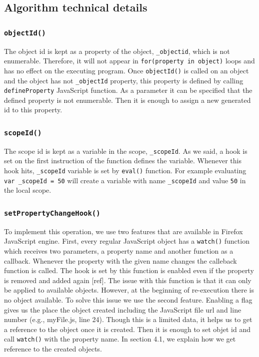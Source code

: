 \documentclass[preprint]{sigplanconf}
\begin{document}
\subsection{Algorithm technical details}
\subsubsection{\texttt{objectId()}}
The object id is kept as a property of the object, \texttt{\_objectid}, which is not enumerable. Therefore, it will not appear in \texttt{for(property in object)} loops and has no effect on the executing program. Once \texttt{objectId()} is called on an object and the object has not \texttt{\_objectId} property, this property is defined by calling \texttt{defineProperty} JavaScript function. As a parameter it can be specified that the defined property is not enumerable. Then it is enough to assign a new generated id to this property.

\subsubsection{\texttt{scopeId()}}
The scope id is kept as a variable in the scope, \texttt{\_scopeId}. As we said, a hook is set on the first instruction of the function defines the variable. Whenever this hook hits,  \texttt{\_scopeId} variable is set by \texttt{eval()} function. For example evaluating \texttt{var \_scopeId = 50} will create a variable with name \texttt{\_scopeId} and value \texttt{50} in the local scope.

\subsubsection{\texttt{setPropertyChangeHook()}}
To implement this operation, we use two features that are available in Firefox JavaScript engine. First, every regular JavaScript object has a \texttt{watch()} function which receives two parameters, a property name and another function as a callback. Whenever the property with the given name changes the calleback function is called. The hook is set by this function is enabled even if the property is removed and added again [ref]. The issue with this function is that it can only be applied to available objects. However, at the beginning of re-execution there is no object available. To solve this issue we use the second feature. Enabling a flag gives us the place the object created including the JavaScript file url and line number (e.g., myFile.js, line 24). Though this is a limited data, it helps us to get a reference to the object once it is created. Then it is enough to set objet id and call \texttt{watch()} with the property name. In section 4.1, we explain how we get reference to the created objects.
 
\end{document}

